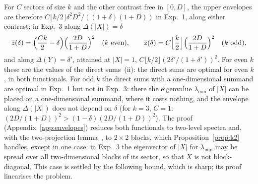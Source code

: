 \documentclass[11pt]{article}
\begin{document}
\noindent For $C$ sectors of size $k$ and the other contrast free in $[0,D]$, the upper envelopes are therefore
$C\lfloor k/2\rfloor\delta^2D^2/((1+\delta)(1+D))$ in Exp.~1, along either contrast; in Exp.~3 along $\Delta(|X|)=\delta$
\[
  \overline z(\delta)=\Bigl(\frac{Ck}2-\delta\Bigr)\Bigl(\frac{2D}{1+D}\Bigr)^2\quad(k\text{ even}),\qquad
  \overline z(\delta)=C\Bigl\lfloor\frac k2\Bigr\rfloor\Bigl(\frac{2D}{1+D}\Bigr)^2\quad(k\text{ odd}),
\]
and along $\Delta(Y)=\delta'$, attained at $|X|=1$, $C\lfloor k/2\rfloor(2\delta'/(1+\delta'))^2$. For even $k$ these are
the values of the direct sums~(ii): the direct sums are optimal for even $k$, in both functionals. For odd $k$ the
direct sums with a one-dimensional summand are optimal in Exp.~1 but not in Exp.~3: there the eigenvalue
$\lambda_{\min}$ of $|X|$ can be placed on a one-dimensional summand, where it costs nothing, and the envelope along
$\Delta(|X|)$ does not depend on $\delta$ (for $k=3$, $C=1$: $(2D/(1+D))^2>(1-\delta)(2D/(1+D))^2$). The
proof (Appendix~\ref{app:envelopes}) reduces both functionals to two-level spectra and, with the two-projection lemma~\cite{halmos1969}, to
$2\times2$ blocks, which Proposition~\ref{prop:k2} handles, except in one case: in Exp.~3 the eigenvector of $|X|$ for
$\lambda_{\min}$ may be spread over all two-dimensional blocks of its sector, so that $X$ is not block-diagonal. This case
is settled by the following bound, which is sharp; its proof linearises the problem.
\end{document}
